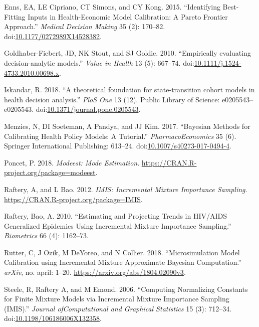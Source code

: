 \documentclass[]{article}
\begin{document}
\hypertarget{ref-Enns2015}{}
Enns, EA, LE Cipriano, CT Simons, and CY Kong. 2015. ``Identifying
Best-Fitting Inputs in Health-Economic Model Calibration: A Pareto
Frontier Approach.'' \emph{Medical Decision Making} 35 (2): 170--82.
doi:\href{https://doi.org/10.1177/0272989X14528382}{10.1177/0272989X14528382}.

\hypertarget{ref-Goldhaber-Fiebert2010}{}
Goldhaber-Fiebert, JD, NK Stout, and SJ Goldie. 2010. ``Empirically
evaluating decision-analytic models.'' \emph{Value in Health} 13 (5):
667--74.
doi:\href{https://doi.org/10.1111/j.1524-4733.2010.00698.x}{10.1111/j.1524-4733.2010.00698.x}.

\hypertarget{ref-Iskandar2018}{}
Iskandar, R. 2018. ``A theoretical foundation for state-transition
cohort models in health decision analysis.'' \emph{PloS One} 13 (12).
Public Library of Science: e0205543--e0205543.
doi:\href{https://doi.org/10.1371/journal.pone.0205543}{10.1371/journal.pone.0205543}.

\hypertarget{ref-Menzies2017}{}
Menzies, N, DI Soeteman, A Pandya, and JJ Kim. 2017. ``Bayesian Methods
for Calibrating Health Policy Models: A Tutorial.''
\emph{PharmacoEconomics} 35 (6). Springer International Publishing:
613--24.
doi:\href{https://doi.org/10.1007/s40273-017-0494-4}{10.1007/s40273-017-0494-4}.

\hypertarget{ref-modeest}{}
Poncet, P. 2018. \emph{Modeest: Mode Estimation}.
\url{https://CRAN.R-project.org/package=modeest}.

\hypertarget{ref-IMIS}{}
Raftery, A, and L Bao. 2012. \emph{IMIS: Incremental Mixture Importance
Sampling}. \url{https://CRAN.R-project.org/package=IMIS}.

\hypertarget{ref-Raftery2010}{}
Raftery, Bao, A. 2010. ``Estimating and Projecting Trends in HIV/AIDS
Generalized Epidemics Using Incremental Mixture Importance Sampling.''
\emph{Biometrics} 66 (4): 1162--73.

\hypertarget{ref-Rutter2018}{}
Rutter, C, J Ozik, M DeYoreo, and N Collier. 2018. ``Microsimulation
Model Calibration using Incremental Mixture Approximate Bayesian
Computation.'' \emph{arXiv}, no. april: 1--20.
\url{https://arxiv.org/abs/1804.02090v3}.

\hypertarget{ref-Steele2006}{}
Steele, R, Raftery A, and M Emond. 2006. ``Computing Normalizing
Constants for Finite Mixture Models via Incremental Mixture Importance
Sampling (IMIS).'' \emph{Journal ofComputational and Graphical
Statistics} 15 (3): 712--34.
doi:\href{https://doi.org/10.1198/106186006X132358}{10.1198/106186006X132358}.
\end{document}
